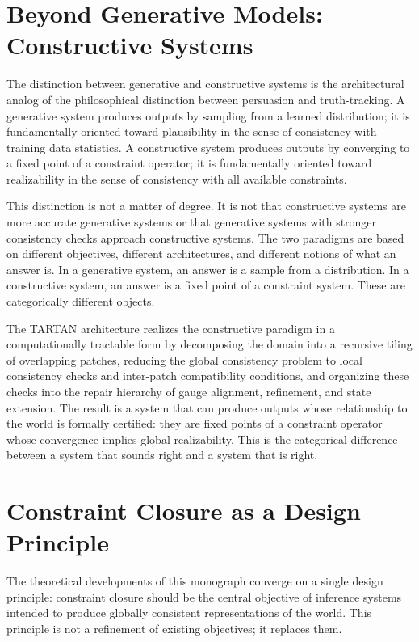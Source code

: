 \documentclass[11pt, oneside]{article}
\begin{document}
\section{Beyond Generative Models: Constructive Systems}

The distinction between generative and constructive systems is the architectural analog of the philosophical distinction between persuasion and truth-tracking. A generative system produces outputs by sampling from a learned distribution; it is fundamentally oriented toward plausibility in the sense of consistency with training data statistics. A constructive system produces outputs by converging to a fixed point of a constraint operator; it is fundamentally oriented toward realizability in the sense of consistency with all available constraints.

This distinction is not a matter of degree. It is not that constructive systems are more accurate generative systems or that generative systems with stronger consistency checks approach constructive systems. The two paradigms are based on different objectives, different architectures, and different notions of what an answer is. In a generative system, an answer is a sample from a distribution. In a constructive system, an answer is a fixed point of a constraint system. These are categorically different objects.

The TARTAN architecture realizes the constructive paradigm in a computationally tractable form by decomposing the domain into a recursive tiling of overlapping patches, reducing the global consistency problem to local consistency checks and inter-patch compatibility conditions, and organizing these checks into the repair hierarchy of gauge alignment, refinement, and state extension. The result is a system that can produce outputs whose relationship to the world is formally certified: they are fixed points of a constraint operator whose convergence implies global realizability. This is the categorical difference between a system that sounds right and a system that is right.

\section{Constraint Closure as a Design Principle}

The theoretical developments of this monograph converge on a single design principle: constraint closure should be the central objective of inference systems intended to produce globally consistent representations of the world. This principle is not a refinement of existing objectives; it replaces them.
\end{document}

